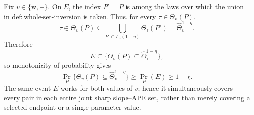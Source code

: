 Fix \(v\in\{\mathrm w,+\}\).  On \(E\), the index \(P'=P\) is among the laws over which the union in \(\mathrm{def{:}whole\text{-}set\text{-}inversion}\) is taken.  Thus, for every \(\tau\in\Theta_v(P)\),
\[
 \tau\in\Theta_v(P)
 \subseteq
 \bigcup_{P'\in\Gamma_n(1-\eta)}\Theta_v(P')
 =\widehat\Theta_v^{1-\eta}.
\]
Therefore
\[
 E\subseteq
 \{\Theta_v(P)\subseteq\widehat\Theta_v^{1-\eta}\},
\]
so monotonicity of probability gives
\[
 \Pr_P\{\Theta_v(P)\subseteq\widehat\Theta_v^{1-\eta}\}
 \geq \Pr_P(E)\geq1-\eta.
\]
The same event \(E\) works for both values of \(v\); hence it simultaneously covers every pair in each entire joint sharp slope--APE set, rather than merely covering a selected endpoint or a single parameter value.

